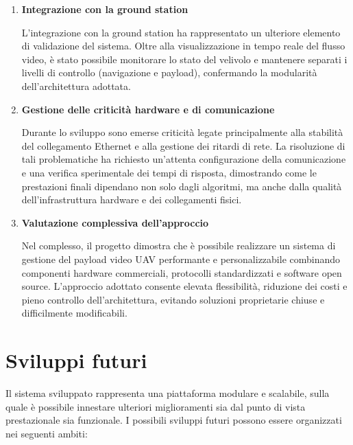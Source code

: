 \begin{enumerate}
\item \textbf{Integrazione con la ground station}  

L’integrazione con la ground station ha rappresentato un ulteriore elemento
di validazione del sistema. Oltre alla visualizzazione in tempo reale del
flusso video, è stato possibile monitorare lo stato del velivolo e mantenere
separati i livelli di controllo (navigazione e payload), confermando la
modularità dell’architettura adottata.

\item \textbf{Gestione delle criticità hardware e di comunicazione}  

Durante lo sviluppo sono emerse criticità legate principalmente alla
stabilità del collegamento Ethernet e alla gestione dei ritardi di rete.
La risoluzione di tali problematiche ha richiesto un’attenta configurazione
della comunicazione e una verifica sperimentale dei tempi di risposta,
dimostrando come le prestazioni finali dipendano non solo dagli algoritmi,
ma anche dalla qualità dell’infrastruttura hardware e dei collegamenti fisici.

\item \textbf{Valutazione complessiva dell’approccio}  

Nel complesso, il progetto dimostra che è possibile realizzare un sistema
di gestione del payload video UAV performante e personalizzabile
combinando componenti hardware commerciali, protocolli standardizzati
e software open source. L’approccio adottato consente elevata flessibilità,
riduzione dei costi e pieno controllo dell’architettura, evitando soluzioni
proprietarie chiuse e difficilmente modificabili.

\end{enumerate}

\section{Sviluppi futuri}

Il sistema sviluppato rappresenta una piattaforma modulare e scalabile,
sulla quale è possibile innestare ulteriori miglioramenti sia dal punto di
vista prestazionale sia funzionale. I possibili sviluppi futuri possono essere
organizzati nei seguenti ambiti:


